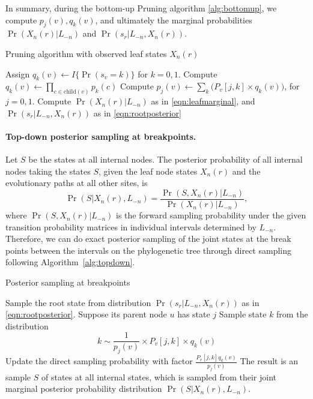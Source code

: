 \documentclass[11pt]{article}
\newcommand{\child}[1]{\ensuremath{\mathrm{child}(#1)}}
\begin{document}
In summary, during the bottom-up Pruning algorithm \ref{alg:bottomup}, we compute
$p_j(v), q_k(v)$, and ultimately the marginal probabilities
 $\Pr(X_n(r) | L_{-n})$ and $\Pr(s_r|L_{-n}, X_n(r))$.

\begin{algorithm}[t]
  \begin{algorithmic}[1]
    \caption{Pruning algorithm with observed leaf states $X_n(r)$}\label{alg:bottomup}
    \STATE Assign $q_k(v) \leftarrow I\{\Pr(s_v = k)\}$ for $k = 0, 1$.
    \ELSE
    \STATE Compute $q_k(v) \leftarrow \prod_{c\in \child{v}}  p_{k}(c)$
    \ENDIF
    \STATE Compute $p_j(v) \leftarrow \sum\limits_{k} \bigg(P_v[j,k] \times q_k(v)\bigg)$, for $j = 0, 1$.
    \ELSE
    \STATE Compute $\Pr(X_n(r) | L_{-n})$ as in
    \eqref{eqn:leafmarginal}, and $\Pr(s_r| L_{-n}, X_n(r))$ as in
    \eqref{eqn:rootposterior}
    \ENDIF
    \ENDFOR
  \end{algorithmic}
\end{algorithm}


\paragraph{Top-down posterior sampling at breakpoints.}
Let $S$ be the states at all internal nodes. The posterior probability
of all internal nodes taking the states $S$, given the leaf node
states $X_n(r)$ and the evolutionary paths at all other sites, is
\[
\Pr(S | X_n(r), L_{-n}) = \frac{\Pr(S, X_n(r) | L_{-n}) }{\Pr(X_n(r) | L_{-n})},
\]
where $\Pr(S, X_n(r) | L_{-n}) $ is the forward sampling probability
under the given transition probability matrices in individual
intervals determined by $L_{-n}$.
Therefore, we can do exact posterior sampling of the joint states at
the break points between the intervals on the phylogenetic tree through
direct sampling following Algorithm~\ref{alg:topdown}.

\begin{algorithm}[t]
  \begin{algorithmic}[1]
    \caption{Posterior sampling at breakpoints}\label{alg:topdown}
    \STATE Sample the root state from distribution $\Pr(s_r|L_{-n}, X_n(r))$ as in \eqref{eqn:rootposterior}.
    \STATE Suppose its parent node $u$ has state $j$
    \STATE Sample state $k$ from the distribution
    \[k \sim \frac{1}{p_j(v)}\times P_v[j,k] \times q_k(v) \]
    \STATE Update the direct sampling probability with factor  $\frac{P_v[j,k]q_k(v)}{p_j(v)}$
    \ENDFOR
    \STATE The result is an sample $S$ of states at all internal states,
  which is sampled from their joint marginal posterior probability
  distribution $\Pr(S| X_n(r), L_{-n}) $.
  \end{algorithmic}
\end{algorithm}
\end{document}
